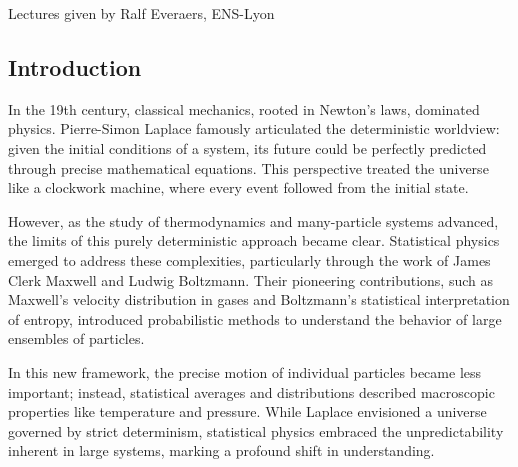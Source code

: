 \documentclass[ansiapaper]{report}
\author{Andrea}
\begin{document}
\fontsize{9}{10}\selectfont%

\renewcommand{\contentsname}{Contents} %


\vskip6pt
\begin{center}
	\noindent {}\vspace{.5cm}

    Lectures given by Ralf Everaers, ENS-Lyon
\end{center}
\vskip9pt

\begin{multicols}{3}

	\renewcommand{\baselinestretch}{1.1}\normalsize %
	{\footnotesize \sffamily \tableofcontents} %



	\renewcommand{\baselinestretch}{1.0}\normalsize

	\fontsize{9}{10}\selectfont
	\chapter{Introduction}
	In the 19th century, classical mechanics, rooted in Newton’s laws, dominated physics. Pierre-Simon Laplace famously articulated the deterministic worldview: given the initial conditions of a system, its future could be perfectly predicted through precise mathematical equations. This perspective treated the universe like a clockwork machine, where every event followed from the initial state.

	However, as the study of thermodynamics and many-particle systems advanced, the limits of this purely deterministic approach became clear. Statistical physics emerged to address these complexities, particularly through the work of James Clerk Maxwell and Ludwig Boltzmann. Their pioneering contributions, such as Maxwell's velocity distribution in gases and Boltzmann's statistical interpretation of entropy, introduced probabilistic methods to understand the behavior of large ensembles of particles.

	In this new framework, the precise motion of individual particles became less important; instead, statistical averages and distributions described macroscopic properties like temperature and pressure. While Laplace envisioned a universe governed by strict determinism, statistical physics embraced the unpredictability inherent in large systems, marking a profound shift in understanding.


\end{multicols}
\end{document}

